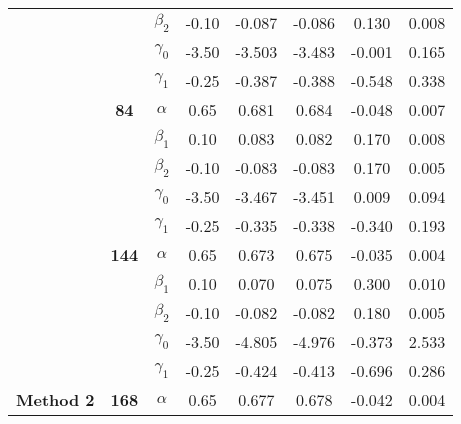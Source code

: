 \begin{table}[h]
\begin{tabular}[t]{>{}c>{}ccccccc}
 &  & $\beta_2$ & -0.10 & -0.087 & -0.086 & 0.130 & 0.008\\

 &  & $\gamma_0$ & -3.50 & -3.503 & -3.483 & -0.001 & 0.165\\

 &  & $\gamma_1$ & -0.25 & -0.387 & -0.388 & -0.548 & 0.338\\

 & \multirow{-5}{*}{\centering\arraybackslash \textbf{84}} & $\alpha$ & 0.65 & 0.681 & 0.684 & -0.048 & 0.007\\

 &  & $\beta_1$ & 0.10 & 0.083 & 0.082 & 0.170 & 0.008\\

 &  & $\beta_2$ & -0.10 & -0.083 & -0.083 & 0.170 & 0.005\\

 &  & $\gamma_0$ & -3.50 & -3.467 & -3.451 & 0.009 & 0.094\\

 &  & $\gamma_1$ & -0.25 & -0.335 & -0.338 & -0.340 & 0.193\\

 & \multirow{-5}{*}{\centering\arraybackslash \textbf{144}} & $\alpha$ & 0.65 & 0.673 & 0.675 & -0.035 & 0.004\\

 &  & $\beta_1$ & 0.10 & 0.070 & 0.075 & 0.300 & 0.010\\

 &  & $\beta_2$ & -0.10 & -0.082 & -0.082 & 0.180 & 0.005\\

 &  & $\gamma_0$ & -3.50 & -4.805 & -4.976 & -0.373 & 2.533\\

 &  & $\gamma_1$ & -0.25 & -0.424 & -0.413 & -0.696 & 0.286\\

\multirow{-15}{*}{\centering\arraybackslash \textbf{Method 2}} & \multirow{-5}{*}{\centering\arraybackslash \textbf{168}} & $\alpha$ & 0.65 & 0.677 & 0.678 & -0.042 & 0.004\\
\bottomrule
\end{tabular}
\end{table}
